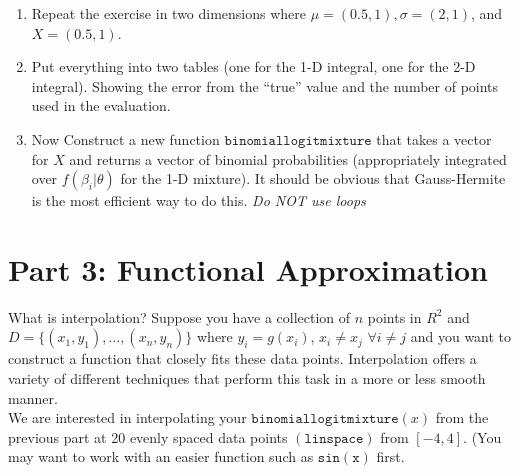 \documentclass{article}
\begin{document}
\begin{enumerate}
\item Repeat the exercise in two dimensions where $\mu = (0.5,1), \sigma = (2,1)$, and $X=(0.5,1)$.
\item Put everything into two tables (one for the 1-D integral, one for the 2-D integral). Showing the error from the ``true'' value and the number of points used in the evaluation.
\begin{comment}
\begin{table}[htdp]
\caption{2-D Results True value: 0.7145}
\begin{center}
\begin{tabular}{l r r r }
Method & Points & Error\\
quad & n/a & 1e-14 \\
monte carlo & 100 &  0.0174\\
Gauss Hermite(PR) & 25 & 0.0250\\
SGI-GQN & 13 & 0.0091\\
SGI-KPN & 17 & -6.9355e-04\\
\end{tabular}
\end{center}
\end{table}%
\end{comment}
\item Now Construct a new function $\mathtt{binomiallogitmixture}$ that takes a vector for $X$ and returns a vector of binomial probabilities (appropriately integrated over $f(\beta_i | \theta)$ for the 1-D mixture). It should be obvious that Gauss-Hermite is the most efficient way to do this. \textit{Do NOT use loops}
\end{enumerate}

\section*{Part 3: Functional Approximation}
What is interpolation? Suppose you have a collection of $n$ points in $R^2$ and $D=\{(x_1,y_1),\ldots,(x_n,y_n)\}$  where $y_i = g(x_i)$, $x_i \neq x_j$  $\forall i \neq j$ and you want to construct a function that closely fits these data points. Interpolation offers a variety of different techniques that perform this task in a more or less smooth manner.\\


We are interested in interpolating your $\mathtt{binomiallogitmixture}(x)$ from the previous part at 20 evenly spaced data points $(\mathtt{linspace})$ from $[-4,4]$. (You may want to work with an easier function such as $\mathtt{sin(x)}$ first.\\
\end{document}
